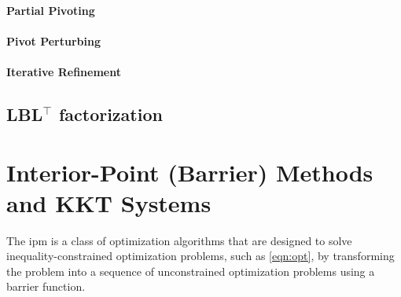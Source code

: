 \documentclass{article}
\begin{document}
\paragraph{Partial Pivoting}
\paragraph{Pivot Perturbing}
\paragraph{Iterative Refinement}


\subsection{LBL$^\top$ factorization}












\section{Interior-Point (Barrier) Methods and KKT Systems}\label{eqn:ipm}
The \gls*{ipm} is a class of optimization algorithms that are designed to solve inequality-constrained optimization problems, such as \cref{eqn:opt}, by transforming the problem into a sequence of unconstrained optimization problems using a barrier function.
\end{document}
